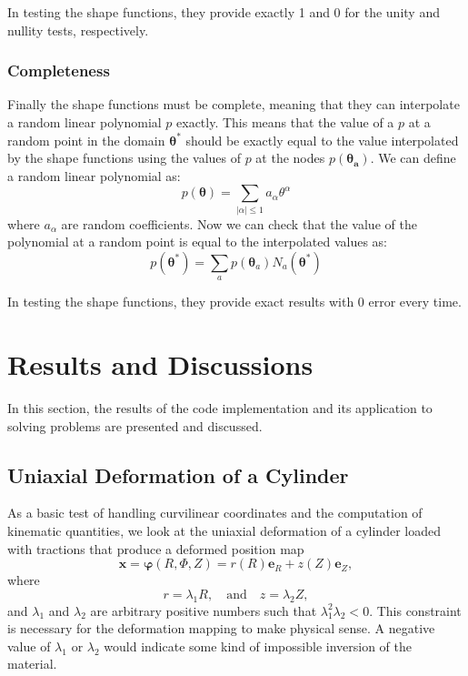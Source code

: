 \documentclass[]{spie}  %
\begin{document}
In testing the shape functions, they provide exactly 1 and 0 for the unity and nullity tests, respectively. 

\subsubsection{Completeness}
Finally the shape functions must be complete, meaning that they can interpolate a random linear polynomial $p$ exactly. This means that the value of a $p$ at a random point in the domain $\bm{\theta^*}$ should be exactly equal to the value interpolated by the shape functions using the values of $p$ at the nodes $p(\bm{\theta_a})$. We can define a random linear polynomial as:
\begin{equation}
p(\bm{\theta}) = \sum\limits_{|\alpha| \leq 1} a_{\alpha}\theta^{\alpha}
\end{equation}
where $a_{\alpha}$ are random coefficients. Now we can check that the value of the polynomial at a random point is equal to the interpolated values as:
\begin{equation}
\label{eq: completeness}
p(\bm{\theta^*}) = \sum\limits_{a} p(\bm{\theta}_a) N_a(\bm{\theta^*})
\end{equation}

In testing the shape functions, they provide exact results with 0 error every time. 

\section{Results and Discussions}
In this section, the results of the code implementation and its application to solving problems are presented and discussed. 

\subsection{Uniaxial Deformation of a Cylinder}
As a basic test of handling curvilinear coordinates and the computation of kinematic quantities, we look at the uniaxial deformation of a cylinder loaded with tractions that produce a deformed position map
\[
\bm{x} = \bm{\varphi}(R,\Phi,Z) = r(R) \bm{e}_R + z(Z) \bm{e}_Z ,
\]
where 
\[
r = \lambda_1 R, \quad \text{and} \quad z = \lambda_2 Z,
\]
and $\lambda_1$ and $\lambda_2$ are arbitrary positive numbers such that $\lambda_1^2\lambda_2<0$. This constraint is necessary for the deformation mapping to make physical sense. A negative value of $\lambda_1$ or $\lambda_2$ would indicate some kind of impossible inversion of the material. 
\end{document}
